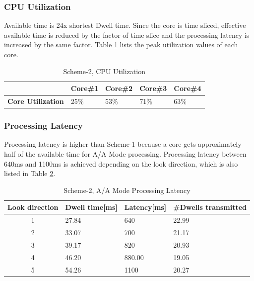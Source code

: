 \subsubsection{CPU Utilization}
\label{sss:scheme2:cpu_util}
Available time is 24x shortest Dwell time. Since the core is time sliced, effective available time is reduced by the factor of time slice and the processing latency is increased by the same factor. Table \ref{tbl:existing_analysis:aa_scheme2_cpu_util} lists the peak utilization values of each core.

\begin{table}[h!]
	\centering
	\begin{tabular}{|l|l|l|l|l|} 
	 \hline
	 & \textbf{Core\#1} & \textbf{Core\#2} & \textbf{Core\#3} & \textbf{Core\#4} \\ \hline
	 \textbf{Core Utilization} & 25\% & 53\% & 71\% & 63\% \\ \hline
	\end{tabular}
	\caption{Scheme-2, CPU Utilization}
	\label{tbl:existing_analysis:aa_scheme2_cpu_util}
\end{table}

\subsubsection{Processing Latency}
\label{sss:scheme2:latency}
Processing latency is higher than Scheme-1 because a core gets approximately half of the available time for A/A Mode processing. Processing latency between 640ms and 1100ms is achieved depending on the look direction, which is also listed in Table \ref{tbl:existing_analysis:aa_scheme2_latency}.

\begin{table}[h!]
	\centering
	\begin{tabular}{|c|l|l|l|} 
	 \hline
	 \textbf{Look direction} & \textbf{Dwell time[ms]} & \textbf{Latency[ms]} & \textbf{\#Dwells transmitted} \\
	 \hline
	 1 & 27.84 & 640 & 22.99 \\ \hline
	 2 & 33.07 & 700 & 21.17 \\ \hline
	 3 & 39.17 & 820 & 20.93 \\ \hline
	 4 & 46.20 & 880.00 & 19.05 \\ \hline
	 5 & 54.26 & 1100 & 20.27 \\ \hline
	\end{tabular}
	\caption{Scheme-2, A/A Mode Processing Latency}
	\label{tbl:existing_analysis:aa_scheme2_latency}
\end{table}

